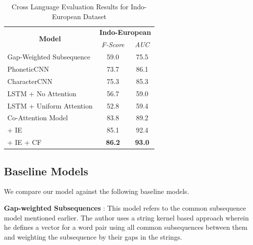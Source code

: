 \documentclass[11pt,letterpaper]{article}
\begin{document}
\begin{table}[t]
\centering

\begin{tabular}{lcc}
\multicolumn{1}{c}{\multirow{2}{*}{\textbf{Model}}} & \multicolumn{2}{c}{\textbf{Indo-European}} \\ \cline{2-3} 
\multicolumn{1}{c}{}                                & \textit{F-Score}      & \textit{AUC}       \\ \hline
Gap-Weighted Subsequence                            & 59.0                  & 75.5               \\
PhoneticCNN                                         & 73.7                  & 86.1               \\
CharacterCNN                                        & 75.3                  & 85.3               \\
LSTM + No Attention                                 & 56.7                  & 59.0               \\
LSTM + Uniform Attention                            & 52.8                  & 59.4               \\ \hline
Co-Attention Model                                  & 83.8                  & 89.2               \\
\quad + IE                                          & 85.1                  & 92.4               \\
\quad + IE + CF                                     & \textbf{86.2}         & \textbf{93.0}     
\end{tabular}

\label{CL_res}
\caption{Cross Language Evaluation Results for Indo-European Dataset }
\end{table}
\subsection{Baseline Models}

We compare our model against the following baseline models. 

\textbf{Gap-weighted Subsequences} : This model refers to the common subsequence model \cite{rama2015automatic} mentioned earlier. The author uses a string kernel based approach wherein he defines a vector for a word pair using all common subsequences between them and weighting the subsequence by their gaps in the strings.
\end{document}
